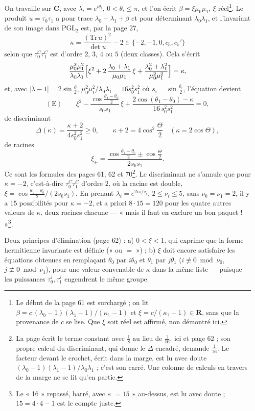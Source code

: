 \documentclass[11pt,a4paper]{article}
\begin{document}
On travaille sur $\mathbf{C}$, avec $\lambda_i = e^{i\theta_i}$, $0 < \theta_i
\leq \pi$, et l'on écrit $\beta = \xi\mu_0\mu_1$, $\xi$ réel\footnote{Le début
de la page 61 est surchargé ; on lit $\beta = c\,(\lambda_0 - 1)(\lambda_1 -
1)/(\kappa_1 - 1)$ et $\xi = c/(\kappa_1 - 1) \in \mathbf{R}$, sans que la
provenance de $c$ se lise. Que $\xi$ soit réel est affirmé, non démontré
ici.}. Le produit $u = \tau_0\tau_1$ a pour trace $\lambda_0 + \lambda_1 +
\beta$ et pour déterminant $\lambda_0\lambda_1$, et l'invariant de son image
dans $\mathrm{PGL}_2$ est, par la page 27,
\[
  \kappa = \frac{(\mathrm{Tr}\, u)^2}{\det u} - 2 \in \{-2, -1, 0, c_5, c_5'\}
\]
selon que $\tau_0^C\tau_1^C$ est d'ordre $2$, $3$, $4$ ou $5$ (deux classes).
Cela s'écrit
\[
  \frac{\mu_0^2\mu_1^2}{\lambda_0\lambda_1}\Bigl[\xi^2 + 2\,
  \frac{\lambda_0 + \lambda_1}{\mu_0\mu_1}\,\xi + \frac{\lambda_0^2 +
  \lambda_1^2}{\mu_0^2\mu_1^2}\Bigr] = \kappa ,
\]
et, avec $|\lambda - 1| = 2\sin\frac\theta2$, $\mu_0^2\mu_1^2/\lambda_0\lambda_1
= 16 s_0^2 s_1^2$ où $s_i = \sin\frac{\theta_i}{2}$, l'équation devient
\[
  (\mathrm E) \qquad \xi^2 - \frac{\cos\frac{\theta_1 - \theta_0}{2}}{s_0 s_1}\,
  \xi + \frac{2\cos(\theta_1 - \theta_0) - \kappa}{16\, s_0^2 s_1^2} = 0 ,
\]
de discriminant
\[
  \Delta(\kappa) = \frac{\kappa + 2}{4 s_0^2 s_1^2} \geq 0, \qquad \kappa + 2 =
  4\cos^2\frac\Theta2 \quad (\kappa = 2\cos\Theta) ,
\]
de racines
\[
  \xi_\pm = \frac{\cos\frac{\theta_1 - \theta_0}{2} \pm
  \cos\frac{\Theta}{2}}{2 s_0 s_1} .
\]
Ce sont les formules des pages 61, 62 et 70\footnote{La page écrit le terme
constant avec $\frac18$ au lieu de $\frac1{16}$, ici et page 62 ; son propre
calcul du discriminant, qui donne le $\Delta$ encadré, demande $\frac1{16}$. Le
facteur devant le crochet, écrit dans la marge, est lu avec doute
$(\lambda_0 - 1)(\lambda_1 - 1)/\lambda_0\lambda_1$ ; c'est son carré. Une
colonne de calculs en travers de la marge ne se lit qu'en partie.}.
Le discriminant ne s'annule que pour $\kappa = -2$, c'est-à-dire
$\tau_0^C\tau_1^C$ d'ordre $2$, où la racine est double, $\xi = \cos\frac{\theta_1
- \theta_0}{2}/(2s_0s_1)$. En prenant $\lambda_i = e^{2i\pi/\nu_i}$, $2 \leq
\nu_i \leq 5$, sans $\nu_0 = \nu_1 = 2$, il y a $15$ possibilités pour
$\kappa = -2$, et a priori $8 \cdot 15 = 120$ pour les quatre autres valeurs de
$\kappa$, deux racines chacune --- « mais il faut en exclure un bon
paquet ! »\footnote{Le « 16 » repassé, barré, avec « $= 15$ » au-dessus, est
lu avec doute ; $15 = 4 \cdot 4 - 1$ est le compte juste.}.

Deux principes d'élimination (page 62) : a) $0 < \xi < 1$, qui exprime que la
forme hermitienne invariante est définie (« ou $=$ ») ; b) $\xi$ doit encore
satisfaire les équations obtenues en remplaçant $\theta_0$ par $i\theta_0$
et $\theta_1$ par $j\theta_1$ ($i \not\equiv 0 \bmod \nu_0$, $j \not\equiv 0
\bmod \nu_1$), pour une valeur convenable de $\kappa$ dans la même liste ---
puisque les puissances $\tau_0^i, \tau_1^j$ engendrent le même groupe.
\end{document}
